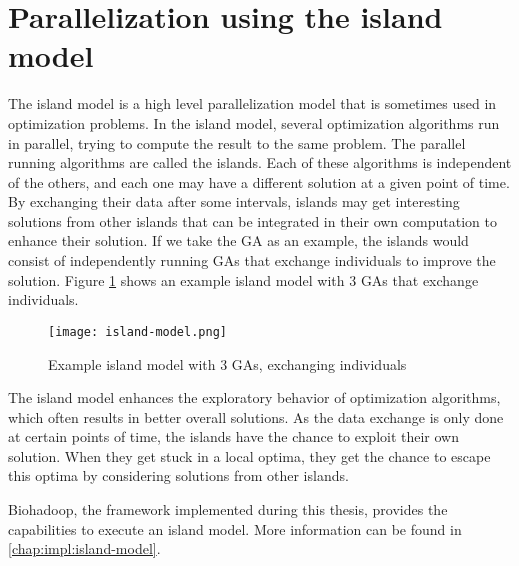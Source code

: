 \section{Parallelization using the island model}
\label{chap:bioalgorithms:island-model}
The island model is a high level parallelization model that is sometimes used in optimization problems. In the island model, several optimization algorithms run in parallel, trying to compute the result to the same problem. The parallel running algorithms are called the islands. Each of these algorithms is independent of the others, and each one may have a different solution at a given point of time. By exchanging their data after some intervals, islands may get interesting solutions from other islands that can be integrated in their own computation to enhance their solution. If we take the GA as an example, the islands would consist of independently running GAs that exchange individuals to improve the solution. Figure \ref{fig:island-model} shows an example island model with 3 GAs that exchange individuals.

\begin{figure}[ht!]
  \centering
  \texttt{[image: island-model.png]}
  \caption{Example island model with 3 GAs, exchanging individuals}
  \label{fig:island-model}
\end{figure}

The island model enhances the exploratory behavior of optimization algorithms, which often results in better overall solutions. As the data exchange is only done at certain points of time, the islands have the chance to exploit their own solution. When they get stuck in a local optima, they get the chance to escape this optima by considering solutions from other islands.

Biohadoop, the framework implemented during this thesis, provides the capabilities to execute an island model. More information can be found in \ref{chap:impl:island-model}.

% 
% 
